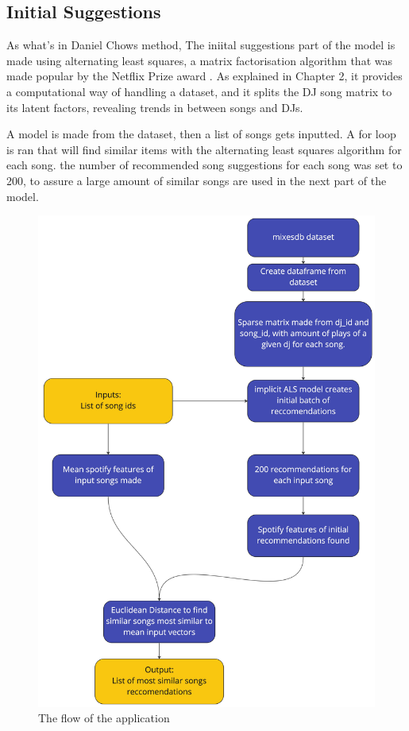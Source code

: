 \subsection{Initial Suggestions}
As what's in Daniel Chows method, The iniital suggestions part of the model is made using alternating least squares, a matrix factorisation algorithm that was made popular by the Netflix Prize award \citep{zhou_large-scale_2008}. As explained in Chapter 2, it provides a computational way of handling a dataset, and it splits the DJ song matrix to its latent factors, revealing trends in between songs and DJs.

A model is made from the dataset, then a list of songs gets inputted. A for loop is ran that will find similar items with the alternating least squares algorithm for each song. the number of recommended song suggestions for each song was set to 200, to assure a large amount of similar songs are used in the next part of the model.
\begin{figure}[H]{\noindent\ignorespaces}
	\includegraphics[scale=0.1]{images/application_app_flow}
	\centering
	\caption{The flow of the application} 
\end{figure}


